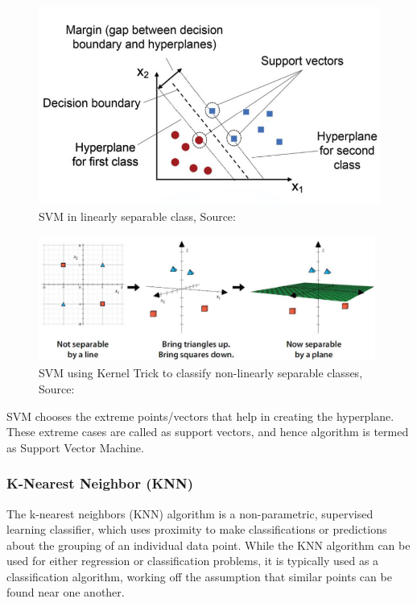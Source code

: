         \begin{figure}
            \centering
            \includegraphics[width=0.75\linewidth]{graphics//chapter3/svm linear.png}
            \caption{SVM in linearly separable class, Source:\cite{gml}}
            \label{fig:svm-linear}
        \end{figure}

        \begin{figure}
            \centering
            \includegraphics[width=1\linewidth]{graphics//chapter3/svm non linear.png}
            \caption{SVM using Kernel Trick to classify non-linearly separable classes, Source: \cite{gml}}
            \label{fig:svm-nonlinear}
        \end{figure}
        
        SVM chooses the extreme points/vectors that help in creating the hyperplane. These extreme cases are called as support vectors, and hence algorithm is termed as Support Vector Machine.
        
        \subsubsection{K-Nearest Neighbor (KNN)}
        The k-nearest neighbors (KNN) algorithm is a non-parametric, supervised learning classifier, which uses proximity to make classifications or predictions about the grouping of an individual data point. While the KNN algorithm can be used for either regression or classification problems, it is typically used as a classification algorithm, working off the assumption that similar points can be found near one another\cite{knn}.\par \vspace{1em}

